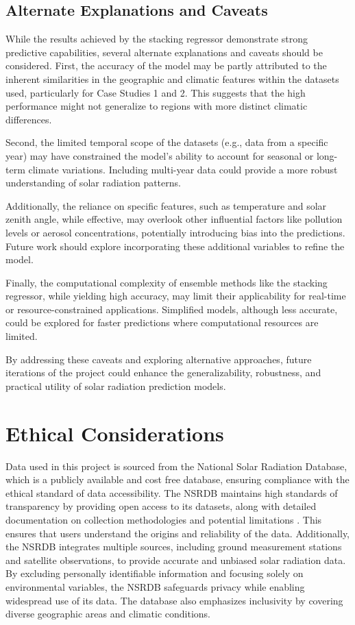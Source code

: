 \documentclass[10pt,twocolumn]{article}
\begin{document}
\begin{itemize}
 \subsection{Alternate Explanations and Caveats}
While the results achieved by the stacking regressor demonstrate strong predictive capabilities, several alternate explanations and caveats should be considered. First, the accuracy of the model may be partly attributed to the inherent similarities in the geographic and climatic features within the datasets used, particularly for Case Studies 1 and 2. This suggests that the high performance might not generalize to regions with more distinct climatic differences. 

Second, the limited temporal scope of the datasets (e.g., data from a specific year) may have constrained the model's ability to account for seasonal or long-term climate variations. Including multi-year data could provide a more robust understanding of solar radiation patterns.

Additionally, the reliance on specific features, such as temperature and solar zenith angle, while effective, may overlook other influential factors like pollution levels or aerosol concentrations, potentially introducing bias into the predictions. Future work should explore incorporating these additional variables to refine the model.

Finally, the computational complexity of ensemble methods like the stacking regressor, while yielding high accuracy, may limit their applicability for real-time or resource-constrained applications. Simplified models, although less accurate, could be explored for faster predictions where computational resources are limited.

By addressing these caveats and exploring alternative approaches, future iterations of the project could enhance the generalizability, robustness, and practical utility of solar radiation prediction models.

  

\section{Ethical Considerations}

Data used in this project is sourced from the National Solar Radiation Database, which is a publicly available and cost free database, ensuring compliance with the ethical standard of data accessibility. The NSRDB maintains high standards of transparency by providing open access to its datasets, along with detailed documentation on collection methodologies and potential limitations \cite{1}. This ensures that users understand the origins and reliability of the data. Additionally, the NSRDB integrates multiple sources, including ground measurement stations and satellite observations, to provide accurate and unbiased solar radiation data\cite{1}. By excluding personally identifiable information and focusing solely on environmental variables, the NSRDB safeguards privacy while enabling widespread use of its data. The database also emphasizes inclusivity by covering diverse geographic areas and climatic conditions. 



\end{itemize}
\end{document}

